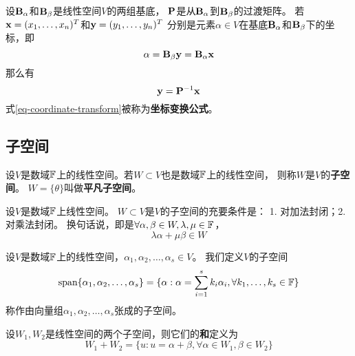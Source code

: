 \begin{theorem}[坐标变换公式]
  设$\mathbf{B}_{\alpha}$和$\mathbf{B}_{\beta}$是线性空间$V$的两组基底，
  $\mathbf{P}$是从$\mathbf{B}_{\alpha}$到$\mathbf{B}_{\beta}$的过渡矩阵。
  若$\mathbf{x}=(x_1,\dots,x_n)^T$和$\mathbf{y}=(y_1,\dots,y_n)^T$
  分别是元素$\alpha\in V$在基底$\mathbf{B}_{\alpha}$和$\mathbf{B}_{\beta}$下的坐标，即
  \[ \alpha = \mathbf{B}_{\beta}\mathbf{y} = \mathbf{B}_{\alpha}\mathbf{x} \]
  那么有
  \begin{equation} \label{eq-coordinate-transform}
    \mathbf{y} = \mathbf{P}^{-1}\mathbf{x}
  \end{equation}
  式\ref{eq-coordinate-transform}被称为\textbf{坐标变换公式}。
\end{theorem}

\subsection{子空间}
\begin{definition}
  设$V$是数域$\mathbb{F}$上的线性空间。若$W\subset V$也是数域$\mathbb{F}$上的线性空间，
  则称$W$是$V$的\textbf{子空间}。
  $W=\{\theta\}$叫做\textbf{平凡子空间}。
\end{definition}

\begin{theorem}[子空间的充要条件]
  设$V$是数域$\mathbb{F}$上线性空间。
  $W\subset V$是$V$的子空间的充要条件是：
  1. 对加法封闭；2. 对乘法封闭。
  换句话说，即是$\forall\alpha,\beta\in W,\lambda,\mu\in\mathbb{F}$，
  \[ \lambda\alpha + \mu\beta \in W \]
\end{theorem}

\begin{definition}[子集张成的子空间]
    设$V$是数域$\mathbb{F}$上的线性空间，$\alpha_1,\alpha_2,\dots,\alpha_s\in V$。
    我们定义$V$的子空间
    \begin{displaymath}
    \textrm{span}\{ \alpha_1,\alpha_2,\dots,\alpha_s \} =
    \{ \alpha: \alpha=\sum_{i=1}^{s}k_i\alpha_i, \forall k_1,\dots,k_s\in\mathbb{F} \}
    \end{displaymath}
    称作由向量组$\alpha_1,\alpha_2,\dots,\alpha_s$张成的子空间。
\end{definition}

\begin{definition}[线性空间的和]
  设$W_1,W_2$是线性空间的两个子空间，则它们的\textbf{和}定义为
  \begin{displaymath}
    W_1+W_2 = \{ u: u=\alpha+\beta, \forall\alpha\in W_1,\beta\in W_2 \}
  \end{displaymath}
\end{definition}

